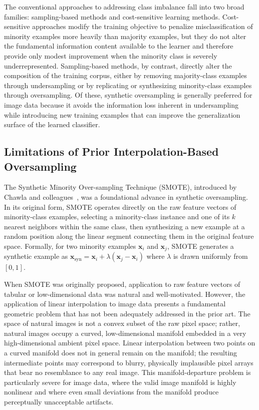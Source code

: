 \documentclass[12pt,letterpaper]{article}
\newcommand{\bx}{\mathbf{x}}
\begin{document}
The conventional approaches to addressing class imbalance fall into two broad
families: sampling-based methods and cost-sensitive learning methods. Cost-
sensitive approaches modify the training objective to penalize misclassification
of minority examples more heavily than majority examples, but they do not alter
the fundamental information content available to the learner and therefore
provide only modest improvement when the minority class is severely
underrepresented. Sampling-based methods, by contrast, directly alter the
composition of the training corpus, either by removing majority-class examples
through undersampling or by replicating or synthesizing minority-class examples
through oversampling. Of these, synthetic oversampling is generally preferred
for image data because it avoids the information loss inherent in undersampling
while introducing new training examples that can improve the generalization
surface of the learned classifier.

\subsection{Limitations of Prior Interpolation-Based Oversampling}

The Synthetic Minority Over-sampling Technique (SMOTE), introduced by Chawla
and colleagues~\cite{chawla2002}, was a foundational advance in synthetic
oversampling. In its original form, SMOTE operates directly on the raw feature
vectors of minority-class examples, selecting a minority-class instance and one
of its $k$ nearest neighbors within the same class, then synthesizing a new
example at a random position along the linear segment connecting them in the
original feature space. Formally, for two minority examples $\bx_i$ and
$\bx_j$, SMOTE generates a synthetic example as $\bx_{\text{syn}} = \bx_i +
\lambda(\bx_j - \bx_i)$ where $\lambda$ is drawn uniformly from $[0,1]$.

When SMOTE was originally proposed, application to raw feature vectors of
tabular or low-dimensional data was natural and well-motivated. However, the
application of linear interpolation to image data presents a fundamental
geometric problem that has not been adequately addressed in the prior art. The
space of natural images is not a convex subset of the raw pixel space; rather,
natural images occupy a curved, low-dimensional manifold embedded in a very
high-dimensional ambient pixel space. Linear interpolation between two points
on a curved manifold does not in general remain on the manifold; the resulting
intermediate points may correspond to blurry, physically implausible pixel
arrays that bear no resemblance to any real image. This manifold-departure
problem is particularly severe for image data, where the valid image manifold
is highly nonlinear and where even small deviations from the manifold produce
perceptually unacceptable artifacts.
\end{document}
